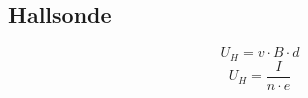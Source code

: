 \subsection{Hallsonde}
\begin{equation}
  U_H = v \cdot B \cdot d
\end{equation}
\begin{equation}
  U_H = \frac{I}{n \cdot e}
\end{equation}